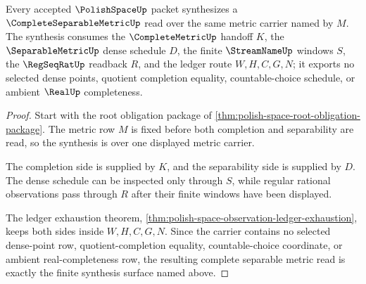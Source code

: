 \begin{theorem}
\label{thm:polish-space-complete-separable-synthesis}
Every accepted $\PolishSpaceUp$ packet synthesizes a $\CompleteSeparableMetricUp$ read over the same metric carrier named by $M$. The synthesis consumes the $\CompleteMetricUp$ handoff $K$, the $\SeparableMetricUp$ dense schedule $D$, the finite $\StreamNameUp$ windows $S$, the $\RegSeqRatUp$ readback $R$, and the ledger route $W,H,C,G,N$; it exports no selected dense points, quotient completion equality, countable-choice schedule, or ambient $\RealUp$ completeness.
\end{theorem}
\begin{proof}
Start with the root obligation package of \autoref{thm:polish-space-root-obligation-package}. The metric row $M$ is fixed before both completion and separability are read, so the synthesis is over one displayed metric carrier.

The completion side is supplied by $K$, and the separability side is supplied by $D$. The dense schedule can be inspected only through $S$, while regular rational observations pass through $R$ after their finite windows have been displayed.

The ledger exhaustion theorem, \autoref{thm:polish-space-observation-ledger-exhaustion}, keeps both sides inside $W,H,C,G,N$. Since the carrier contains no selected dense-point row, quotient-completion equality, countable-choice coordinate, or ambient real-completeness row, the resulting complete separable metric read is exactly the finite synthesis surface named above.
\end{proof}


